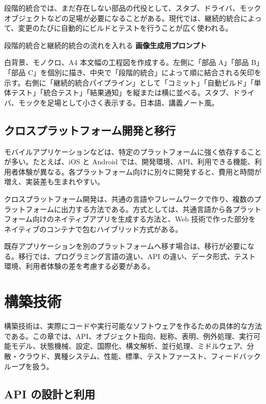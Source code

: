 \documentclass[a4paper,11pt,ja=standard,xelatex]{bxjsarticle}
\begin{document}
段階的統合では、まだ存在しない部品の代役として、スタブ、ドライバ、モックオブジェクトなどの足場が必要になることがある。現代では、継続的統合によって、変更のたびに自動的にビルドとテストを行うことが広く使われる。

\begin{todobox}{段階的統合と継続的統合の流れを入れる}
\textbf{画像生成用プロンプト}

白背景、モノクロ、A4 本文幅の工程図を作成する。左側に「部品 A」「部品 B」「部品 C」を個別に描き、中央で「段階的統合」によって順に結合される矢印を示す。右側に「継続的統合パイプライン」として「コミット」「自動ビルド」「単体テスト」「統合テスト」「結果通知」を縦または横に並べる。スタブ、ドライバ、モックを足場として小さく表示する。日本語、講義ノート風。
\end{todobox}

\subsection{クロスプラットフォーム開発と移行}

モバイルアプリケーションなどは、特定のプラットフォームに強く依存することが多い。たとえば、iOS と Android では、開発環境、API、利用できる機能、利用者体験が異なる。各プラットフォーム向けに別々に開発すると、費用と時間が増え、実装差も生まれやすい。

クロスプラットフォーム開発は、共通の言語やフレームワークで作り、複数のプラットフォームに出力する方法である。方式としては、共通言語から各プラットフォーム向けのネイティブアプリを生成する方法と、Web 技術で作った部分をネイティブのコンテナで包むハイブリッド方式がある。

既存アプリケーションを別のプラットフォームへ移す場合は、移行が必要になる。移行では、プログラミング言語の違い、API の違い、データ形式、テスト環境、利用者体験の差を考慮する必要がある。

\section{構築技術}

構築技術は、実際にコードや実行可能なソフトウェアを作るための具体的な方法である。この章では、API、オブジェクト指向、総称、表明、例外処理、実行可能モデル、状態機械、設定、国際化、構文解析、並行処理、ミドルウェア、分散・クラウド、異種システム、性能、標準、テストファースト、フィードバックループを扱う。

\subsection{API の設計と利用}
\end{document}

